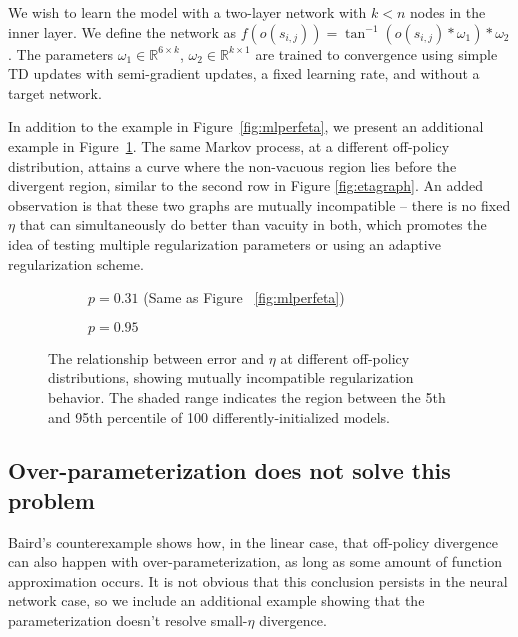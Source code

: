 We wish to learn the model with a two-layer network with $k < n$ nodes in the inner layer.
We define the network as $f(o(s_{i,j})) = \tan^{-1}(o(s_{i, j}) * \omega_1) * \omega_2$. The parameters $\omega_1 \in \mathbb R^{6\times k}$, $\omega_2 \in \mathbb R^{k \times 1}$ are trained to convergence using simple TD updates with semi-gradient updates, a fixed learning rate, and without a target network.

In addition to the example in Figure~\ref{fig:mlperfeta}, we present an additional example in Figure~\ref{fig:twomultilayerperfs}. The same Markov process, at a different off-policy distribution, attains a curve where the non-vacuous region lies before the divergent region, similar to the second row in Figure \ref{fig:etagraph}. An added observation is that these two graphs are mutually incompatible -- there is no fixed $\eta$ that can simultaneously do better than vacuity in both, which promotes the idea of testing multiple regularization parameters or using an adaptive regularization scheme.

\begin{figure}[b]
  \begin{subfigure}[t]{0.48\textwidth}
    \centering
    
    \caption{$p=0.31$ (Same as Figure~
      \ref{fig:mlperfeta})}
  \end{subfigure}
  \hfill
  \begin{subfigure}[t]{0.48\textwidth}
    \centering
    
    \caption{$p=0.95$}
  \end{subfigure}
  \caption{The relationship between error and $\eta$ at different off-policy distributions, showing mutually incompatible regularization behavior. The shaded range indicates the region between the 5th and 95th percentile of 100 differently-initialized models. }
  \label{fig:twomultilayerperfs}
\end{figure}

\subsection{Over-parameterization does not solve this problem}

Baird's counterexample \cite{baird1993counterexample} shows how, in the linear case, that off-policy divergence can also happen with over-parameterization, as long as some amount of function approximation occurs. It is not obvious that this conclusion persists in the neural network case, so we include an additional example showing that the parameterization doesn't resolve small-$\eta$ divergence.


